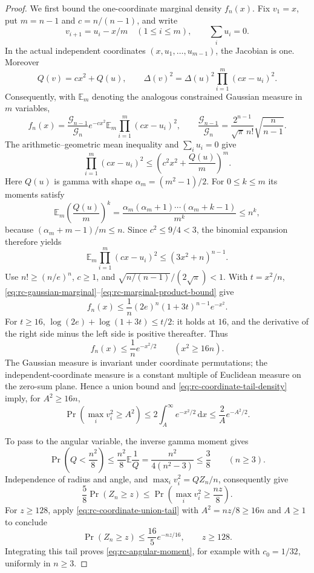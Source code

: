 \documentclass[11pt]{article}
\numberwithin{equation}{section}
\theoremstyle{definition}
\newcommand{\dd}{\,\mathrm d}
\begin{document}
\begin{proof}
We first bound the one-coordinate marginal density $f_n(x)$.
Fix $v_1=x$, put $m=n-1$ and $c=n/(n-1)$, and write
\[
 v_{i+1}=u_i-x/m\quad(1\le i\le m),\qquad \sum_i u_i=0.
\]
In the actual independent coordinates
$(x,u_1,\ldots,u_{m-1})$, the Jacobian is one.  Moreover
\[
 Q(v)=cx^2+Q(u),\qquad
 \Delta(v)^2=\Delta(u)^2\prod_{i=1}^m(cx-u_i)^2.
\]
Consequently, with $\mathbb E_m$ denoting the analogous constrained
Gaussian measure in $m$ variables,
\begin{equation}\label{eq:rc-gaussian-marginal}
 f_n(x)=\frac{\mathcal G_{n-1}}{\mathcal G_n}e^{-cx^2}
       \mathbb E_m\prod_{i=1}^m(cx-u_i)^2,
 \qquad
 \frac{\mathcal G_{n-1}}{\mathcal G_n}
 =\frac{2^{n-1}}{\sqrt\pi\,n!}\sqrt{\frac n{n-1}}.
\end{equation}
The arithmetic--geometric mean inequality and $\sum_i u_i=0$
give
\[
 \prod_{i=1}^m(cx-u_i)^2
 \le\left(c^2x^2+\frac{Q(u)}m\right)^m.
\]
Here $Q(u)$ is gamma with shape $\alpha_m=(m^2-1)/2$.
For $0\le k\le m$ its moments satisfy
\[
 \mathbb E_m\left(\frac{Q(u)}m\right)^k
 =\frac{\alpha_m(\alpha_m+1)\cdots(\alpha_m+k-1)}{m^k}
 \le n^k,
\]
because $(\alpha_m+m-1)/m\le n$.  Since $c^2\le9/4<3$,
the binomial expansion therefore yields
\begin{equation}\label{eq:rc-marginal-product-bound}
 \mathbb E_m\prod_{i=1}^m(cx-u_i)^2
 \le (3x^2+n)^{n-1}.
\end{equation}
Use $n!\ge(n/e)^n$, $c\ge1$, and
$\sqrt{n/(n-1)}/(2\sqrt\pi)<1$.  With $t=x^2/n$,
\eqref{eq:rc-gaussian-marginal}--\eqref{eq:rc-marginal-product-bound}
give
\[
 f_n(x)\le\frac1n(2e)^n(1+3t)^{n-1}e^{-x^2}.
\]
For $t\ge16$,
$\log(2e)+\log(1+3t)\le t/2$: it holds at $16$, and the
derivative of the right side minus the left side is positive
thereafter.  Thus
\begin{equation}\label{eq:rc-coordinate-tail-density}
 f_n(x)\le\frac1n e^{-x^2/2}\qquad(x^2\ge16n).
\end{equation}
The Gaussian measure is invariant under coordinate permutations;
the independent-coordinate measure is a constant multiple of
Euclidean measure on the zero-sum plane.  Hence a union bound and
\eqref{eq:rc-coordinate-tail-density} imply, for $A^2\ge16n$,
\begin{equation}\label{eq:rc-coordinate-union-tail}
 \Pr\left(\max_i v_i^2\ge A^2\right)
 \le2\int_A^\infty e^{-x^2/2}\dd x
 \le\frac2A e^{-A^2/2}.
\end{equation}

To pass to the angular variable, the inverse gamma moment gives
\[
 \Pr\left(Q<\frac{n^2}8\right)
 \le\frac{n^2}8\mathbb E\frac1Q
 =\frac{n^2}{4(n^2-3)}\le\frac38\qquad(n\ge3).
\]
Independence of radius and angle, and
$\max_i v_i^2=QZ_n/n$, consequently give
\[
 \frac58\Pr(Z_n\ge z)
 \le\Pr\left(\max_i v_i^2\ge\frac{nz}8\right).
\]
For $z\ge128$, apply \eqref{eq:rc-coordinate-union-tail} with
$A^2=nz/8\ge16n$ and $A\ge1$ to conclude
\begin{equation}\label{eq:rc-angular-tail}
 \Pr(Z_n\ge z)\le\frac{16}5e^{-nz/16},\qquad z\ge128.
\end{equation}
Integrating this tail proves \eqref{eq:rc-angular-moment}, for
example with $c_0=1/32$, uniformly in $n\ge3$.
\end{proof}
\end{document}
